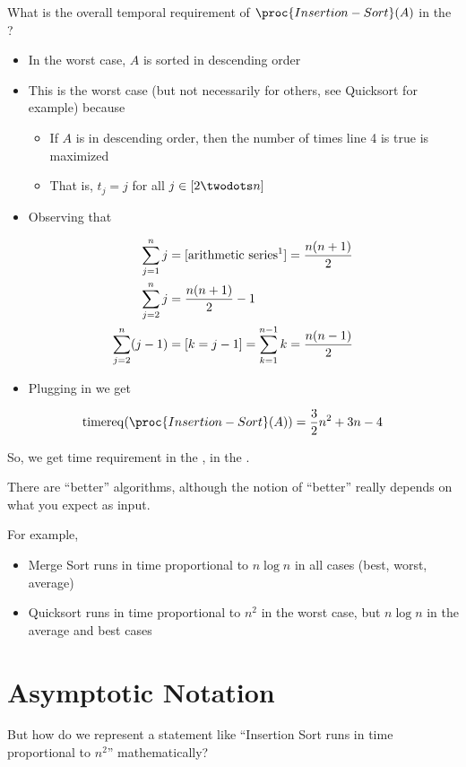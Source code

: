 \documentclass[a4paper]{report}
\newcommand{\bookref}[3]{\marginpar{\faBook{}~#1\\Chapter #2\\Section #3}}
\theoremstyle{definition}
\DeclareMathOperator*{\treq}{timereq}
\begin{document}
What is the overall temporal requirement of $\proc{Insertion-Sort}(A)$ in the ?
\begin{itemize}
\item In the worst case, $A$ is sorted in descending order
\item This is the worst case  (but not necessarily for others, see Quicksort for example) because
\begin{itemize}
\item If $A$ is in descending order, then the number of times line 4 is true is maximized
\item That is, $t_j = j$ for all $j \in [2 \twodots n]$
\end{itemize}
\item Observing that
\end{itemize}
\begin{align*}
\sum_{j=1}^{n} j &= [\text{arithmetic series\footnotemark}] = \frac{n(n+1)}{2}\\
\sum_{j=2}^{n} j &= \frac{n(n+1)}{2}-1\\
\sum_{j=2}^{n} (j-1) &= [k = j-1] = \sum_{k=1}^{n-1} k = \frac{n(n-1)}{2}
\end{align*}
\begin{itemize}
\item Plugging in we get
\end{itemize}
\begin{align*}
\treq(\proc{Insertion-Sort}(A)) = \frac{3}{2}n^2+3n-4
\end{align*}

So, we get  time requirement in the ,  in the .

There are ``better'' algorithms, although the notion of ``better'' really depends on what you expect as input.

For example,
\begin{itemize}
\item Merge Sort runs in time proportional to $n\log n$ in all cases (best, worst, average)
\item Quicksort runs in time proportional to $n^2$ in the worst case, but $n \log n$ in the average and best cases
\end{itemize}

\section{Asymptotic Notation}
\bookref{CLRS}{3}{3.1}
But how do we represent a statement like ``Insertion Sort runs in time proportional to $n^2$'' mathematically?
\end{document}
